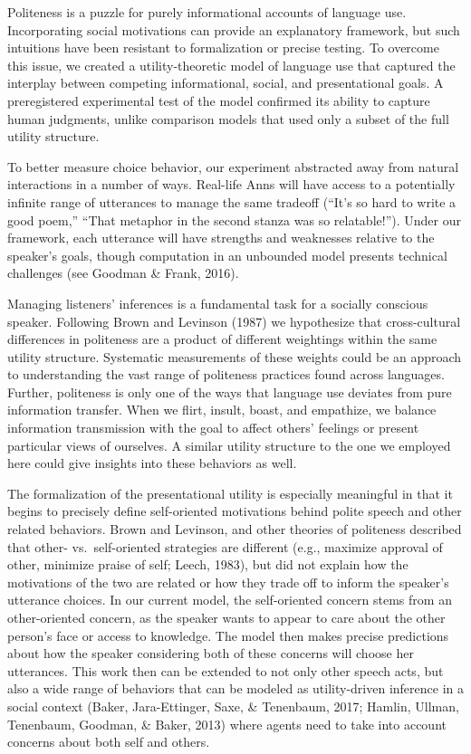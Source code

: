 \documentclass[floatsintext,man]{apa6}
\theoremstyle{definition}
\theoremstyle{definition}
\theoremstyle{definition}
\theoremstyle{remark}
\begin{document}
Politeness is a puzzle for purely informational accounts of language
use. Incorporating social motivations can provide an explanatory
framework, but such intuitions have been resistant to formalization or
precise testing. To overcome this issue, we created a utility-theoretic
model of language use that captured the interplay between competing
informational, social, and presentational goals. A preregistered
experimental test of the model confirmed its ability to capture human
judgments, unlike comparison models that used only a subset of the full
utility structure.

To better measure choice behavior, our experiment abstracted away from
natural interactions in a number of ways. Real-life Anns will have
access to a potentially infinite range of utterances to manage the same
tradeoff (\enquote{It's so hard to write a good poem,} \enquote{That
metaphor in the second stanza was so relatable!}). Under our framework,
each utterance will have strengths and weaknesses relative to the
speaker's goals, though computation in an unbounded model presents
technical challenges (see Goodman \& Frank, 2016).

Managing listeners' inferences is a fundamental task for a socially
conscious speaker. Following Brown and Levinson (1987) we hypothesize
that cross-cultural differences in politeness are a product of different
weightings within the same utility structure. Systematic measurements of
these weights could be an approach to understanding the vast range of
politeness practices found across languages. Further, politeness is only
one of the ways that language use deviates from pure information
transfer. When we flirt, insult, boast, and empathize, we balance
information transmission with the goal to affect others' feelings or
present particular views of ourselves. A similar utility structure to
the one we employed here could give insights into these behaviors as
well.

The formalization of the presentational utility is especially meaningful
in that it begins to precisely define self-oriented motivations behind
polite speech and other related behaviors. Brown and Levinson, and other
theories of politeness described that other- vs.~self-oriented
strategies are different (e.g., maximize approval of other, minimize
praise of self; Leech, 1983), but did not explain how the motivations of
the two are related or how they trade off to inform the speaker's
utterance choices. In our current model, the self-oriented concern stems
from an other-oriented concern, as the speaker wants to appear to care
about the other person's face or access to knowledge. The model then
makes precise predictions about how the speaker considering both of
these concerns will choose her utterances. This work then can be
extended to not only other speech acts, but also a wide range of
behaviors that can be modeled as utility-driven inference in a social
context (Baker, Jara-Ettinger, Saxe, \& Tenenbaum, 2017; Hamlin, Ullman,
Tenenbaum, Goodman, \& Baker, 2013) where agents need to take into
account concerns about both self and others.
\end{document}
